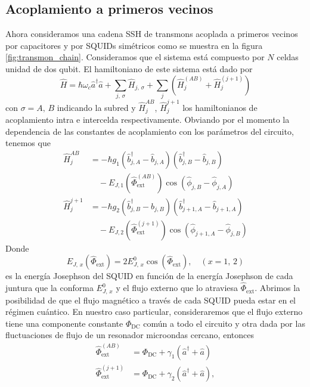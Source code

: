 \subsection{Acoplamiento a primeros vecinos}
Ahora consideramos una cadena SSH de transmons acoplada a primeros vecinos por capacitores y por SQUIDs simétricos como se muestra en la figura \ref{fig:transmon_chain}. Consideramos que el sistema está compuesto por $N$ celdas unidad de dos qubit. El hamiltoniano de este sistema está dado por
\begin{equation}
    \hat H = \hbar \omega_c \hat a^\dag \hat a + \sum_{j,\, \sigma} \hat H_{j, \, \sigma} + \sum_{j} \left(\hat H_{j}^{(AB)} + \hat H_{j}^{(j+1)}\right)
\end{equation}
con $\sigma = A, \, B$ indicando la subred y $\hat H_j^{AB}$, $\hat H_j^{j+1}$ los hamiltonianos de acoplamiento intra e intercelda respectivamente. Obviando por el momento la dependencia de las constantes de acoplamiento con los parámetros del circuito, tenemos que
\begin{subequations}
    \begin{align}
        \hat H_j^{AB} &= -\hbar g_{1}(\hat b^\dag_{j, A} - \hat b_{j, A})(\hat b^\dag_{j, B} - \hat b_{j, B}) \nonumber\\
                      &\quad - E_{J, 1}(\hat \Phi^{(AB)}_{\text{ext}})\cos(\hat \phi_{j, B} - \hat \phi_{j, A})\\
        \hat H_j^{j+1} &= -\hbar g_{2}(\hat b^\dag_{j, B} - \hat b_{j, B})(\hat b^\dag_{j+1, A} - \hat b_{j+1, A}) \nonumber\\
                       &\quad - E_{J, 2}(\hat \Phi^{(j+1)}_{\text{ext}})\cos(\hat \phi_{j+1, A} - \hat \phi_{j, B})
    \end{align}
\end{subequations}
Donde
\begin{equation}
    E_{J,\, x}(\hat \Phi_{\text{ext}}) = 2E_{J,\, x}^0\cos(\hat \Phi_{\text{ext}}),\quad (x=1,\, 2)
\end{equation}
es la energía Josephson del SQUID en función de la energía Josephson de cada juntura que la conforma $E_{J,\, x}^0$ y el flujo externo que lo atraviesa $\hat \Phi_{\text{ext}}$. Abrimos la posibilidad de que el flujo magnético a través de cada SQUID pueda estar en el régimen cuántico. En nuestro caso particular, consideraremos que el flujo externo tiene una componente constante $\Phi_{\text{DC}}$ común a todo el circuito y otra dada por las fluctuaciones de flujo de un resonador microondas cercano, entonces
\begin{subequations}
    \begin{align}
        \hat \Phi^{(AB)}_{\text{ext}}&= \Phi_{\text{DC}} + \gamma_1 (\hat a^\dag + \hat a)\\
        \hat \Phi^{(j+1)}_{\text{ext}}&= \Phi_{\text{DC}} + \gamma_2 (\hat a^\dag + \hat a),
    \end{align}
\end{subequations}
